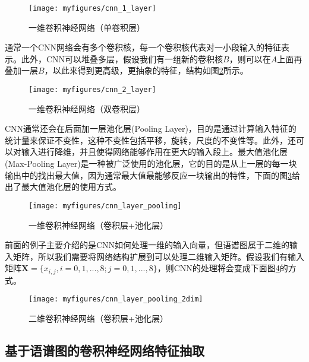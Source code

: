 \begin{figure}[htb] %
    \centering
    \texttt{[image: myfigures/cnn\_1\_layer]}
    \caption{一维卷积神经网络（单卷积层）}
    \label{fig:cnn_1_layer}
\end{figure}

通常一个CNN网络会有多个卷积核，每一个卷积核代表对一小段输入的特征表示。此外，CNN可以堆叠多层，假设我们有一组新的卷积核$B$，则可以在$A$上面再叠加一层$B$，以此来得到更高级，更抽象的特征，结构如图\ref{fig:cnn_2_layer}所示。

\begin{figure}[htb] %
    \centering
    \texttt{[image: myfigures/cnn\_2\_layer]}
    \caption{一维卷积神经网络（双卷积层）}
    \label{fig:cnn_2_layer}
\end{figure}

CNN通常还会在后面加一层池化层(Pooling Layer)，目的是通过计算输入特征的统计量来保证不变性，这种不变性包括平移，旋转，尺度的不变性等。此外，还可以对输入进行降维，并且使得网络能够作用在更大的输入段上。最大值池化层(Max-Pooling Layer)是一种被广泛使用的池化层，它的目的是从上一层的每一块输出中的找出最大值，因为通常最大值最能够反应一块输出的特性，下面的图\ref{fig:cnn_layer_pooling}给出了最大值池化层的使用方式。

\begin{figure}[htb] %
    \centering
    \texttt{[image: myfigures/cnn\_layer\_pooling]}
    \caption{一维卷积神经网络（卷积层+池化层）}
    \label{fig:cnn_layer_pooling}
\end{figure}

前面的例子主要介绍的是CNN如何处理一维的输入向量，但语谱图属于二维的输入矩阵，所以我们需要将网络结构扩展到可以处理二维输入矩阵。假设我们有输入矩阵$\mathbf{X}=\{x_{i,j}, i=0,1,...,8; j=0,1,...,8\}$，则CNN的处理将会变成下面图\ref{fig:cnn_layer_pooling_2dim}的方式。

\begin{figure}[htb] %
    \centering
    \texttt{[image: myfigures/cnn\_layer\_pooling\_2dim]}
    \caption{二维卷积神经网络（卷积层+池化层）}
    \label{fig:cnn_layer_pooling_2dim}
\end{figure}

\subsection{基于语谱图的卷积神经网络特征抽取}
\label{ssec:cnn_spectrogram_feature_extract}

